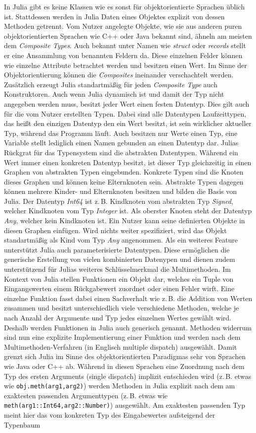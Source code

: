 \documentclass[proseminar,german,utf8]{zihpub}
\newcommand{\zB}[0]{{z.\,B. }}
\begin{document}
In Julia gibt es keine Klassen wie es sonst für objektorientierte Sprachen üblich ist. Stattdessen werden in Julia Daten eines Objektes explizit von dessen Methoden getrennt. Vom Nutzer angelegte Objekte, wie sie aus anderen puren objektorientierten Sprachen wie C++ oder Java bekannt sind, ähneln am meisten dem \textit{Composite Types}. Auch bekannt unter Namen wie \textit{struct} oder \textit{records} stellt er eine Ansammlung von benannten Feldern da. Diese einzelnen Felder können wie einzelne Attribute betrachtet werden und besitzen einen Wert. Im Sinne der Objektorientierung können die \textit{Composites} ineinander verschachtelt werden. Zusätzlich erzeugt Julia standartmäßig für jeden \textit{Composite Type} auch Konstruktoren. Auch wenn Julia dynamisch ist und damit der Typ nicht angegeben werden muss, besitzt jeder Wert einen festen Datentyp. Dies gilt auch für die vom Nutzer erstellten Typen. Dabei sind alle Datentypen Laufzeittypen, das heißt den einzigen Datentyp den ein Wert besitzt, ist sein wirklicher aktueller Typ, während das Programm läuft. Auch besitzen nur Werte einen Typ, eine Variable stellt lediglich einen Namen gebunden an einen Datentyp dar. Julias Rückgrat für das Typensystem sind die abstrakten Datentypen. Während ein Wert immer einen konkreten Datentyp besitzt, ist dieser Typ gleichzeitig in einen Graphen von abstrakten Typen eingebunden. Konkrete Typen sind die Knoten dieses Graphen und können keine Elternknoten sein. Abstrakte Typen dagegen können mehrere Kinder- und Elternknoten besitzen und bilden die Basis von Julia. Der Datentyp \textit{Int64} ist \zB Kindknoten vom abstrakten Typ \textit{Signed}, welcher Kindknoten vom Typ \textit{Integer} ist. Als oberster Knoten steht der Datentyp \textit{Any}, welcher kein Kindknoten ist. Ein Nutzer kann seine definierten Objekte in diesen Graphen einfügen. Wird nichts weiter spezifiziert, wird das Objekt standartmäßig als Kind vom Typ \textit{Any} angenommen. Als ein weiteres Feature unterstützt Julia auch parameterisierte Datentypen. Diese ermöglichen die generische Erstellung von vielen kombinierten Datenypen und dienen zudem unterstützend für Julias weiteres Schlüsselmerkmal \-  die Multimethoden. Im Kontext von Julia stellen Funktionen ein Objekt dar, welches ein Tuple von Eingangswerten einem Rückgabewert zuordnet oder einen Fehler wirft. Eine einzelne Funktion fasst dabei einen Sachverhalt wie \zB die Addition von Werten zusammen und besitzt unterschiedlich viele verschiedene Methoden, welche je nach Anzahl der Argumente und Typ jedes einzelnen Wertes gewählt wird. Deshalb werden Funktionen in Julia auch generisch genannt. Methoden widerrum sind nun eine explizite Implementierung einer Funktion und werden nach dem Multimethoden-Verfahren (in Englisch multiple dispatch) ausgewählt. Damit grenzt sich Julia im Sinne des objektorientierten Paradigmas sehr von Sprachen wie Java oder C++ ab. Während in diesen Sprachen eine Zuordnung nach dem Typ des ersten Arguments (single dispatch) implizit entschieden wird (\zB etwas wie \verb|obj.meth(arg1,arg2)|) werden Methoden in Julia explizit nach dem am exaktesten passenden Argumenttypen (\zB etwas wie \verb|meth(arg1::Int64,arg2::Number)|) ausgewählt. Am exaktesten passenden Typ meint hier das vom konkreten Typ des Eingabewertes aufsteigend der Typenbaum 
\end{document}
